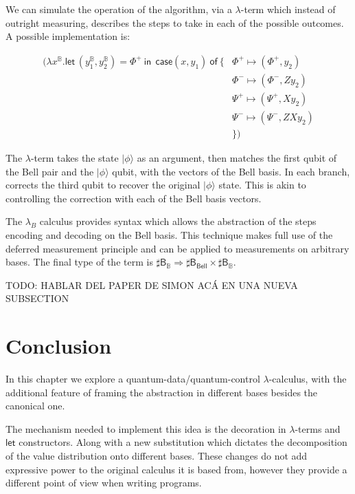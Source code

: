 \documentclass[runningheads,orivec,envcountsame,envcountsect]{llncs}
\newcommand\ket[1]{\ensuremath{|#1\rangle}}
\def\Pair#1#2{(#1,#2)} %
\def\Lam#1#2#3{\lambda#1^{#2}{.}#3} %
\def\letkeyword{\mathsf{let}}
\def\inkeyword{\mathsf{in}}
\def\LetP#1#2#3#4#5#6{\letkeyword\,\Pair{#1^{#2}}{#3^{#4}}=#5~\inkeyword~#6}
\def\Arr{\Rightarrow}
\newcommand\B{\mathbb B}
\newcommand{\Bell}{\mathsf{Bell}}
\newcommand{\lambdaB}{\lambda_B}
\newcommand\basis[1]{\ensuremath{\mathsf{B}_{#1}}}
\begin{document}
We can simulate the operation of the algorithm, via a $\lambda$-term which instead of outright measuring, describes the steps to take in each of the possible outcomes. A possible implementation is:

\begin{align*}
    (\Lam{x}{\B}{\LetP{y_1}{\B}{y_2}{\B}{\Phi^+}{ ~\mathsf{case } \Pair{x}{y_1}  ~\mathsf{ of }~\{ &\Phi^+\mapsto \Pair{\Phi^+}{y_2}\\
    &\Phi^-\mapsto \Pair{\Phi^-}{Z y_2}\\
    &\Psi^+\mapsto \Pair{\Psi^+}{X y_2}\\
    &\Psi^-\mapsto \Pair{\Psi^-}{ZX y_2}\\
    &\}}})
\end{align*}

The $\lambda$-term takes the state $\ket{\phi}$ as an argument, then matches the first qubit of the Bell pair and the $\ket{\phi}$ qubit, with the vectors of the Bell basis. In each branch, corrects the third qubit to recover the original $\ket{\phi}$ state. This is akin to controlling the correction with each of the Bell basis vectors.

The $\lambdaB$ calculus provides syntax which allows the abstraction of the steps encoding and decoding on the Bell basis. This technique makes full use of the deferred measurement principle and can be applied to measurements on arbitrary bases. The final type of the term is $\sharp\basis{\B}\Arr \sharp\basis{\Bell}\times \sharp\basis{\B}$.

{\color{red} TODO: HABLAR DEL PAPER DE SIMON ACÁ EN UNA NUEVA SUBSECTION}

\section{Conclusion}\label{sec:conclusion}

In this chapter we explore a quantum-data/quantum-control $\lambda$-calculus, with the additional feature of framing the abstraction in different bases besides the canonical one.

The mechanism needed to implement this idea is the decoration in $\lambda$-terms and $\mathsf{let}$ constructors. Along with a new substitution which dictates the decomposition of the value distribution onto different bases. These changes do not add expressive power to the original calculus it is based from, however they provide a different point of view when writing programs. 
\end{document}
